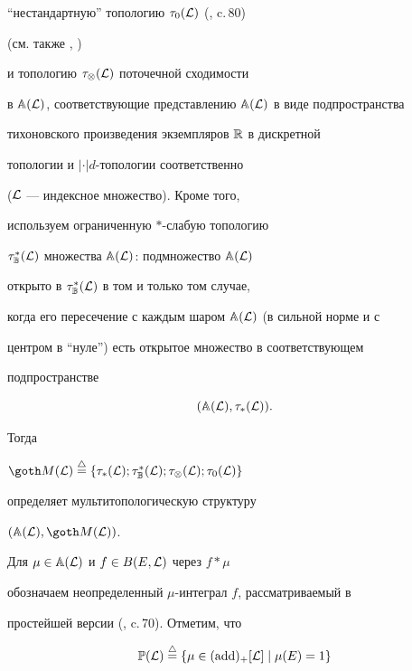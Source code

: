 ``нестандартную'' топологию $\tau_0({\cal L})$ (\cite{Ch1}, c.\,80)


(см. также \cite{Ch2}, \cite{Ch3})


и топологию $\tau_\otimes({\cal L})$ поточечной сходимости


в ${\Bbb A}({\cal L})$, соответствующие представлению ${\Bbb A}({\cal L})$ в виде подпространства


тихоновского произведения экземпляров ${\Bbb R}$ в дискретной


топологии и $|\cdot|d$-топологии соответственно


(${\cal L}$ --- индексное множество). Кроме того,


используем ограниченную $\ast$-слабую топологию


$\tau^*_{\Bbb B}({\cal L})$ множества ${\Bbb A}({\cal L})$: подмножество ${\Bbb A}({\cal L})$


открыто в $\tau^*_{\Bbb B}({\cal L})$ в том и только том случае,


когда его пересечение с каждым шаром ${\Bbb A}({\cal L})$ (в сильной норме и с


центром в ``нуле'') есть открытое множество в соответствующем


подпространстве


%


\begin{equation}


(\AL, \tau_*({\cal L})).


\end{equation}


%


Тогда 


${\goth M}({\cal L}) \stac \{\tau_*({\cal L}); \tau^*_{\Bbb B}({\cal L});


\tau_\otimes({\cal L}); \tau_0({\cal L})\}$ 


определяет мультитопологическую структуру \linebreak




$(\AL, {\goth M}({\cal L}))$. 


Для $\mu \in {\Bbb A}({\cal L})$ и $f \in B(E, {\cal L})$ через $f * \mu$


обозначаем неопределенный $\mu$-интеграл $f$, рассматриваемый в


простейшей версии (\cite{Ch1}, c.\,70). Отметим, что


%


\begin{equation}


{\Bbb P}({\cal L}) \stac \{\mu \in \ad \mid \mu(E) = 1\}


\end{equation}


